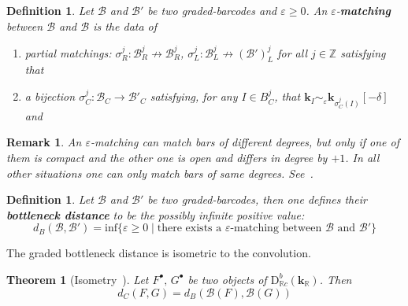 \documentclass[a4paper, english, 11pt]{article}
\newcommand{\kk}[0]{\textbf{k}}
\newcommand{\0}{\vec{0}}
\newcommand{\R}[0]{\mathbb{R}}
\newcommand{\Z}[0]{\mathbb{Z}}
\newcommand{\B}[0]{\mathcal{B}}
\newcommand{\D}[0]{\text{D}}
\newtheorem{remark}[prop]{Remark}
\newtheorem{defi}[prop]{Definition}
\newtheorem{thm}[prop]{Theorem}
\begin{document}
\begin{defi}\label{D:Epsilonmatching}
Let $\B$ and $\B'$ be two graded-barcodes and $\varepsilon \geq 0$. An $\varepsilon$-\textbf{matching} between $\B$ and $\B$ is the data of
\begin{enumerate}
\item partial matchings: $\sigma_R^j: \B^j_R \not \to \B_R^j$, $\sigma_L^j: \B^j_L \not \to (\B')_L^j$ for all $j\in \Z$
satisfying that 
\item a \emph{bijection} $\sigma^j_C :  \B_C \longrightarrow \B'_C$ satisfying,  for any $I \in B^j_C $, that  $\kk_I \sim_\varepsilon \kk_{\sigma^j_C(I)}[-\delta]$ and
\end{enumerate}
\end{defi}
\begin{remark}
 An $\varepsilon$-matching can match bars of different degrees, but only if one of them is compact and  the other one is open and differs in degree by $+1$. In all other situations one can only match bars of same degrees. See~\cite{Berk18}.%
\end{remark}

\begin{defi}
Let $\B$ and $\B'$ be two graded-barcodes, then one defines their \textbf{bottleneck distance} to be the possibly infinite positive value: $$d_B(\B,\B') = \text{inf} \{\varepsilon \geq 0 \mid \text{there exists a } \varepsilon  \text{-matching between } \B \text{ and } \B' \} $$
\end{defi}
The graded bottleneck distance is isometric to the convolution.
\begin{thm}[Isometry~\cite{Berk18}]\label{T:DerivedIsometry}
Let $F^\bullet,\, G^\bullet$ be two objects of $\D^b_{\R c}(\kk_\R)$. Then 
$$ d_C(F,G) =  d_B(\B(F),\B(G))$$
\end{thm} 
\end{document}
